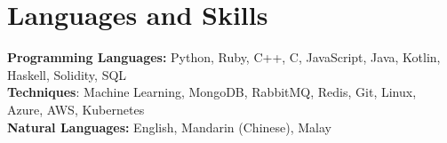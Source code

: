 \documentclass[11pt]{article}       %
\begin{document}
\vspace{-18.5pt}

\section*{Languages and Skills}
\textbf{Programming Languages:} Python, Ruby, C++, C, JavaScript, Java, Kotlin, Haskell, Solidity, SQL \\
\textbf{Techniques}: Machine Learning, MongoDB, RabbitMQ, Redis, Git, Linux, Azure, AWS, Kubernetes \\
\textbf{Natural Languages:} English, Mandarin (Chinese), Malay
\end{document}
